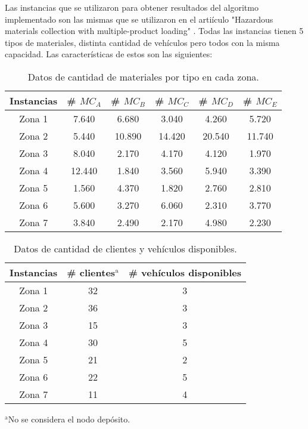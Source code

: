 \documentclass[conference]{IEEEtran}
\begin{document}
Las instancias que se utilizaron para obtener resultados del algoritmo implementado son las mismas que se utilizaron en el arti\'iculo "Hazardous    materials    collection with multiple-product  loading" \cite{b2}. Todas las instancias tienen 5 tipos de materiales, distinta cantidad de veh\'iculos pero todos con la misma capacidad.  Las caracter\'isticas de estos son las siguientes:




\begin{table}[H]

\caption{Datos de cantidad de materiales por tipo en cada zona.}
\begin{center}
\begin{tabular}{|c|c|c|c|c|c|}
\hline
\textbf{Instancias}& \# $MC_A$ & \# $MC_B$ & \# $MC_C$ & \# $MC_D$ & \# $MC_E$\\
 
\hline
Zona 1& 7.640 & 6.680 & 3.040 & 4.260 & 5.720\\
\hline
Zona 2& 5.440 & 10.890 & 14.420 & 20.540 & 11.740\\
\hline
Zona 3& 8.040 & 2.170 & 4.170 & 4.120 & 1.970\\
\hline
Zona 4& 12.440 & 1.840 & 3.560 & 5.940 & 3.390\\
\hline
Zona 5& 1.560 & 4.370 & 1.820 & 2.760 & 2.810\\
\hline
Zona 6& 5.600 & 3.270 & 6.060 & 2.310 & 3.770 \\
\hline
Zona 7& 3.840 & 2.490 & 2.170 & 4.980 & 2.230\\
\hline
\end{tabular}
\label{tab1}
\end{center}
\end{table}


\begin{table}[H]

\caption{Datos de cantidad de clientes y veh\'iculos disponibles.}
\begin{center}
\begin{tabular}{|c|c|c|}
\hline
\textbf{Instancias}& \# clientes$^{\mathrm{a}}$ & \# veh\'iculos disponibles  \\
 
\hline
Zona 1& 32 & 3 \\
\hline
Zona 2& 36 & 3 \\
\hline
Zona 3& 15 & 3 \\
\hline
Zona 4& 30 & 5 \\
\hline
Zona 5& 21 & 2 \\
\hline
Zona 6& 22 & 5 \\
\hline
Zona 7& 11& 4 \\
\hline
\end{tabular}
\label{tab1}
\end{center}
{$^{\mathrm{a}}$No se considera el nodo dep\'osito.}
\end{table}
\end{document}
